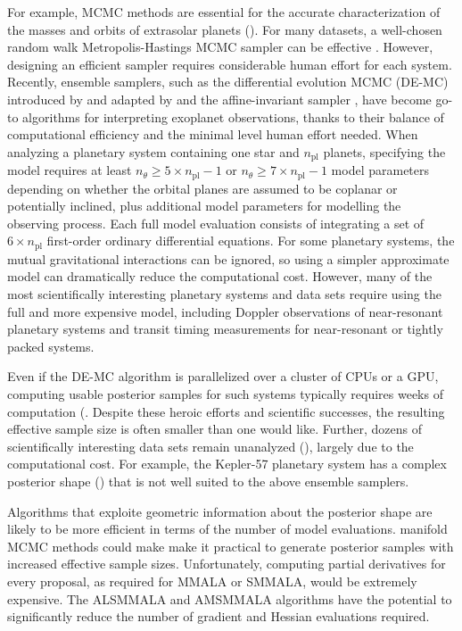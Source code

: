 \documentclass[twoside,11pt]{article}
\begin{document}
For example, MCMC methods are essential for the accurate characterization of the masses and orbits of extrasolar planets 
(\cite{for__qua}). For many datasets, a well-chosen random walk Metropolis-Hastings MCMC sampler can be effective 
\cite{for__im}. However, designing an efficient sampler requires considerable human effort for each system. Recently, 
ensemble samplers, such as the differential evolution MCMC (DE-MC) introduced by \cite{bra__ama} and 
adapted by \cite{nel_for_pay__run} and the affine-invariant sampler \cite{hou_goo_hog__ana, mac_hog_lan__emc}, have become 
go-to algorithms for interpreting exoplanet observations, thanks to their balance of computational efficiency and the 
minimal level human effort needed. When analyzing a planetary system containing one star and $n_{\mathrm{pl}}$ planets, 
specifying the model requires at least $n_{\theta} \ge 5\times n_{\mathrm{pl}}-1$ or
$n_{\theta} \ge 7\times n_{\mathrm{pl}}-1$ model parameters depending on whether the orbital planes are assumed to be 
coplanar or potentially inclined, plus additional model parameters for modelling the observing process. Each full model 
evaluation consists of integrating a set of $6\times n_{\mathrm{pl}}$ first-order ordinary differential equations. For some 
planetary systems, the mutual gravitational interactions can be ignored, so using a simpler approximate model can
dramatically reduce the computational cost. However, many of the most scientifically interesting planetary systems and data 
sets require using the full and more expensive model, including Doppler observations of near-resonant planetary systems and 
transit timing measurements for near-resonant or tightly packed systems.

Even if the DE-MC algorithm is parallelized over a cluster of CPUs or a GPU, computing usable posterior samples for such 
systems typically requires weeks of computation
(\cite{doy_car_fab__kep, car_ago_cha__kep, oro_wel_car__kep, nel_for_wri__the, nel_rob_pay__ane, jon_row_lis__the,
jon_for_row__sec, mil_fab_mig__are}.  
Despite these heroic efforts and scientific successes, the resulting effective sample size is often smaller than one would 
like. Further, dozens of scientifically interesting data sets remain unanalyzed (\cite{hol_maz_nac__tra}), largely due to 
the computational cost. For example, the Kepler-57 planetary system has a complex posterior shape (\cite{jon_for_row__sec}) 
that is not well suited to the above ensemble samplers.

Algorithms that exploite geometric information about the posterior shape are likely to be more efficient in terms of the 
number of model evaluations. manifold MCMC methods could make make it practical to generate posterior samples with increased 
effective sample sizes. Unfortunately, computing partial derivatives for every proposal, as required for MMALA or SMMALA, 
would be extremely expensive. The ALSMMALA and AMSMMALA algorithms have the potential to significantly reduce the number of 
gradient and Hessian evaluations required.  
\end{document}

